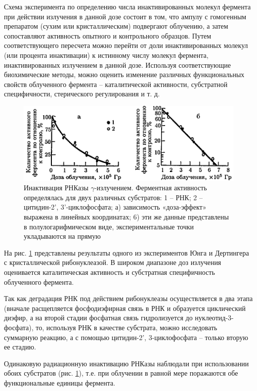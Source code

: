 \documentclass[a4paper, 14pt]{article}
\begin{document}
Схема эксперимента по определению числа инактивированных молекул
фермента при действии излучения в данной дозе состоит в том, что ампулу с
гомогенным препаратом (сухим или кристаллическим) подвергают облучению, а затем
сопоставляют активность опытного и контрольного образцов. 
Путем соответствующего пересчета можно перейти от доли инактивированных молекул (или
процента инактивации) к истинному числу молекул фермента, инактивированных
излучением в данной дозе. Используя соответствующие биохимические методы,
можно оценить изменение различных функциональных свойств облученного фермента – каталитической активности, субстратной специфичности, стерического регулирования и т. д.
\begin{figure}[htbp]
    \centering
    \includegraphics[width=.8\textwidth]{inactivationOfFerment.png}
    \caption{Инактивация РНКазы $\gamma$-излучением. Ферментная активность определялась для     двух различных субстратов: 1 – РНК; 2 – цитидин-2', 3'-циклофосфата; а) зависимость «доза-эффект» выражена в линейных координатах; 6) эти же данные представлены в полулогарифмическом виде, экспериментальные точки укладываются на прямую}
    \label{inactivationOfFerment}
\end{figure}
На рис. \ref{inactivationOfFerment} представлены результаты одного из экспериментов Юнга и
Дертингера с кристаллической рибонуклеазой. В широком диапазоне доз излучения
оценивается каталитическая активность и субстратная специфичность облученного
фермента.

Так как деградация РНК под действием рибонуклеазы осуществляется в два
этапа (вначале расщепляется фосфодиэфирная связь в РНК и образуется циклический
диэфир, а на второй стадии фосфатная связь гидролизуется до нуклеотид-3-фосфата),
то, используя РНК в качестве субстрата, можно исследовать суммарную реакцию, а с
помощью цитидин-2', 3-циклофосфата – только вторую ее стадию.

Одинаковую радиационную инактивацию РНКазы наблюдали при использовании обоих субстратов (рис. \ref{inactivationOfFerment}), т.е. при облучении в равной мере поражаются обе функциональные единицы фермента.
\end{document}
